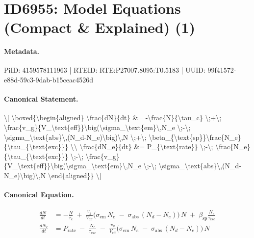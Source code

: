 \section*{ID6955: Model Equations (Compact \& Explained) (1)}
\paragraph{Metadata.}
PiID: 4159578111963 | RTEID: RTE:P27007.8095:T0.5183 | UUID: 99f41572-e88d-59c3-9dab-b15ceac4526d

\paragraph{Canonical Statement.}
\textbackslash{}[ \textbackslash{}boxed\{\textbackslash{}begin\{aligned\} \textbackslash{}frac\{dN\}\{dt\} \&= -\textbackslash{}frac\{N\}\{\textbackslash{}tau\_c\} \textbackslash{};+\textbackslash{}; \textbackslash{}frac\{v\_g\}\{V\_\textbackslash{}text\{eff\}\}\textbackslash{}big(\textbackslash{}sigma\_\textbackslash{}text\{em\}\textbackslash{},N\_e \textbackslash{};-\textbackslash{}; \textbackslash{}sigma\_\textbackslash{}text\{abs\}\textbackslash{},(N\_d-N\_e)\textbackslash{}big)\textbackslash{},N \textbackslash{};+\textbackslash{}; \textbackslash{}beta\_\{\textbackslash{}text\{sp\}\}\textbackslash{}frac\{N\_e\}\{\textbackslash{}tau\_\{\textbackslash{}text\{exc\}\}\} \textbackslash{}\textbackslash{} \textbackslash{}frac\{dN\_e\}\{dt\} \&= P\_\{\textbackslash{}text\{rate\}\} \textbackslash{};-\textbackslash{}; \textbackslash{}frac\{N\_e\}\{\textbackslash{}tau\_\{\textbackslash{}text\{exc\}\}\} \textbackslash{};-\textbackslash{}; \textbackslash{}frac\{v\_g\}\{V\_\textbackslash{}text\{eff\}\}\textbackslash{}big(\textbackslash{}sigma\_\textbackslash{}text\{em\}\textbackslash{},N\_e \textbackslash{};-\textbackslash{}; \textbackslash{}sigma\_\textbackslash{}text\{abs\}\textbackslash{},(N\_d-N\_e)\textbackslash{}big)\textbackslash{},N \textbackslash{}end\{aligned\}\} \textbackslash{}]

\paragraph{Canonical Equation.}
\[
\boxed{\begin{aligned} \frac{dN}{dt} &= -\frac{N}{\tau_c} \;+\; \frac{v_g}{V_\text{eff}}\big(\sigma_\text{em}\,N_e \;-\; \sigma_\text{abs}\,(N_d-N_e)\big)\,N \;+\; \beta_{\text{sp}}\frac{N_e}{\tau_{\text{exc}}} \\ \frac{dN_e}{dt} &= P_{\text{rate}} \;-\; \frac{N_e}{\tau_{\text{exc}}} \;-\; \frac{v_g}{V_\text{eff}}\big(\sigma_\text{em}\,N_e \;-\; \sigma_\text{abs}\,(N_d-N_e)\big)\,N \end{aligned}}
\]

